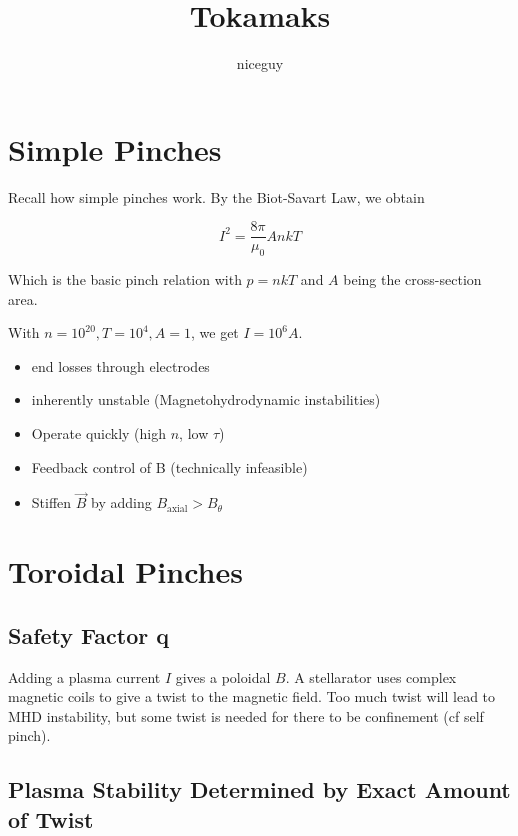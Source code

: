 \documentclass[12pt]{article}
\title{Tokamaks}
\author{niceguy}
\begin{document}
\maketitle

\section{Simple Pinches}

Recall how simple pinches work. By the Biot-Savart Law, we obtain

$$I^2 = \frac{8\pi}{\mu_0} AnkT$$

Which is the basic pinch relation with $p = nkT$ and $A$ being the cross-section area.

\begin{ex}
    With $n = 10^{20}, T = 10^4, A = 1$, we get $I = 10^6\unit{A}$.
\end{ex}
    
\begin{itemize}
    \item end losses through electrodes
    \item inherently unstable (Magnetohydrodynamic instabilities)
\end{itemize}

\begin{itemize}
    \item Operate quickly (high $n$, low $\tau$)
    \item Feedback control of B (technically infeasible)
    \item Stiffen $\vec B$ by adding $B_{\text{axial}} > B_\theta$
\end{itemize}

\section{Toroidal Pinches}

\subsection{Safety Factor q}

Adding a plasma current $I$ gives a poloidal $B$. A stellarator uses complex magnetic coils to give a twist to the magnetic field. Too much twist will lead to MHD instability, but some twist is needed for there to be confinement (cf self pinch).

\subsection{Plasma Stability Determined by Exact Amount of Twist}
\end{document}
